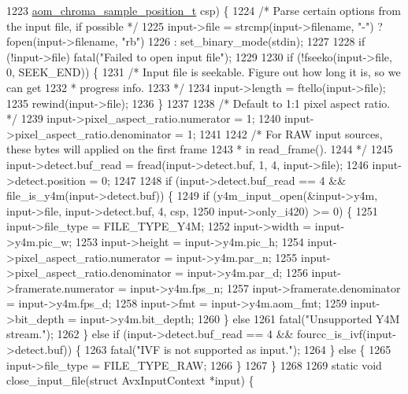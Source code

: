 \begin{DoxyCodeInclude}
{{{{{{{{{{{{{{{1223                             \hyperlink{aom__image_8h_a48f259fc7774b1c799b3ebe7530c19bd}{aom\_chroma\_sample\_position\_t} csp) \{
1224   \textcolor{comment}{/* Parse certain options from the input file, if possible */}
1225   input->file = strcmp(input->filename, \textcolor{stringliteral}{"-"}) ? fopen(input->filename, \textcolor{stringliteral}{"rb"})
1226                                              : set\_binary\_mode(stdin);
1227 
1228   \textcolor{keywordflow}{if} (!input->file) fatal(\textcolor{stringliteral}{"Failed to open input file"});
1229 
1230   \textcolor{keywordflow}{if} (!fseeko(input->file, 0, SEEK\_END)) \{
1231     \textcolor{comment}{/* Input file is seekable. Figure out how long it is, so we can get}
1232 \textcolor{comment}{     * progress info.}
1233 \textcolor{comment}{     */}
1234     input->length = ftello(input->file);
1235     rewind(input->file);
1236   \}
1237 
1238   \textcolor{comment}{/* Default to 1:1 pixel aspect ratio. */}
1239   input->pixel\_aspect\_ratio.numerator = 1;
1240   input->pixel\_aspect\_ratio.denominator = 1;
1241 
1242   \textcolor{comment}{/* For RAW input sources, these bytes will applied on the first frame}
1243 \textcolor{comment}{   *  in read\_frame().}
1244 \textcolor{comment}{   */}
1245   input->detect.buf\_read = fread(input->detect.buf, 1, 4, input->file);
1246   input->detect.position = 0;
1247 
1248   \textcolor{keywordflow}{if} (input->detect.buf\_read == 4 && file\_is\_y4m(input->detect.buf)) \{
1249     \textcolor{keywordflow}{if} (y4m\_input\_open(&input->y4m, input->file, input->detect.buf, 4, csp,
1250                        input->only\_i420) >= 0) \{
1251       input->file\_type = FILE\_TYPE\_Y4M;
1252       input->width = input->y4m.pic\_w;
1253       input->height = input->y4m.pic\_h;
1254       input->pixel\_aspect\_ratio.numerator = input->y4m.par\_n;
1255       input->pixel\_aspect\_ratio.denominator = input->y4m.par\_d;
1256       input->framerate.numerator = input->y4m.fps\_n;
1257       input->framerate.denominator = input->y4m.fps\_d;
1258       input->fmt = input->y4m.aom\_fmt;
1259       input->bit\_depth = input->y4m.bit\_depth;
1260     \} \textcolor{keywordflow}{else}
1261       fatal(\textcolor{stringliteral}{"Unsupported Y4M stream."});
1262   \} \textcolor{keywordflow}{else} \textcolor{keywordflow}{if} (input->detect.buf\_read == 4 && fourcc\_is\_ivf(input->detect.buf)) \{
1263     fatal(\textcolor{stringliteral}{"IVF is not supported as input."});
1264   \} \textcolor{keywordflow}{else} \{
1265     input->file\_type = FILE\_TYPE\_RAW;
1266   \}
1267 \}
1268 
1269 \textcolor{keyword}{static} \textcolor{keywordtype}{void} close\_input\_file(\textcolor{keyword}{struct} AvxInputContext *input) \{
}}}}}}}}}}}}}}}
\end{DoxyCodeInclude}
